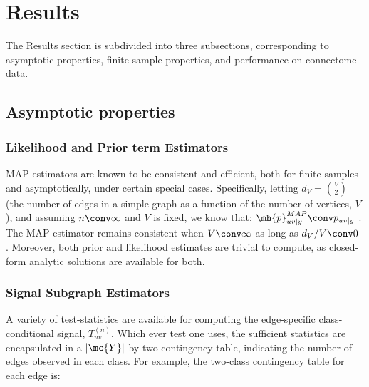 \documentclass[10pt,journal,cspaper,compsoc]{IEEEtran}
\begin{document}




\section{Results} %
\label{sec:results}

The Results section is subdivided into three subsections, corresponding to asymptotic properties, finite sample properties, and performance on connectome data. 

\subsection{Asymptotic properties} %
\label{sub:estimator_properties}

\subsubsection{Likelihood and Prior term Estimators} %
\label{ssub:subsubsection_name4}


MAP estimators are known to be consistent and efficient, both for finite samples and asymptotically, under certain special cases.  Specifically, letting $d_V=\binom{V}{2}$ (the number of edges in a simple graph as a function of the number of vertices, $V$), and assuming $n \conv \infty$ and $V$ is fixed,  we know that: $\mh{p}_{uv|y}^{MAP} \conv p_{uv|y}$ \cite{Rice1995}. The MAP estimator remains consistent when $V \conv \infty$ as long as $d_V/V \conv 0$ \cite{Bickel2000}.  Moreover, both prior and likelihood estimates are trivial to compute, as closed-form analytic solutions are available for both.  %

\subsubsection{Signal Subgraph Estimators} %
\label{ssub:subsubsection_name5}



A variety of test-statistics are available for computing the edge-specific class-conditional signal, $T_{uv}^{(n)}$. Which ever test one uses, the sufficient statistics are encapsulated in a $|\mc{Y}|$ by two contingency table, indicating the number of edges observed in each class.  For example, the two-class contingency table for each edge is:
\end{document}

